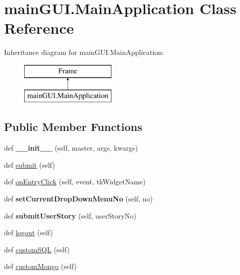 \hypertarget{classmain_g_u_i_1_1_main_application}{}\section{main\+G\+U\+I.\+Main\+Application Class Reference}
\label{classmain_g_u_i_1_1_main_application}
Inheritance diagram for main\+G\+U\+I.\+Main\+Application\+:\begin{figure}[H]
\begin{center}
\leavevmode
\includegraphics[height=2.000000cm]{classmain_g_u_i_1_1_main_application}
\end{center}
\end{figure}
\subsection*{Public Member Functions}
\begin{DoxyCompactItemize}
\item 
\hypertarget{classmain_g_u_i_1_1_main_application_acac3bbf3ac2feae88abdf108ec7d41e0}{}\label{classmain_g_u_i_1_1_main_application_acac3bbf3ac2feae88abdf108ec7d41e0} 
def {\bfseries \+\_\+\+\_\+init\+\_\+\+\_\+} (self, master, args, kwargs)
\item 
def \hyperlink{classmain_g_u_i_1_1_main_application_a828c13a008e6029d6f9aac3d3f6189fd}{submit} (self)
\item 
def \hyperlink{classmain_g_u_i_1_1_main_application_a8389dd29b6914c6e878435ba3176f2af}{on\+Entry\+Click} (self, event, tk\+Widget\+Name)
\item 
\hypertarget{classmain_g_u_i_1_1_main_application_a338c7e4b5eb933d02649355337da1250}{}\label{classmain_g_u_i_1_1_main_application_a338c7e4b5eb933d02649355337da1250} 
def {\bfseries set\+Current\+Drop\+Down\+Menu\+No} (self, no)
\item 
\hypertarget{classmain_g_u_i_1_1_main_application_a32456a8dcc69bf8b72d3c42e8ec9b8f1}{}\label{classmain_g_u_i_1_1_main_application_a32456a8dcc69bf8b72d3c42e8ec9b8f1} 
def {\bfseries submit\+User\+Story} (self, user\+Story\+No)
\item 
def \hyperlink{classmain_g_u_i_1_1_main_application_af3fa9d6210d07607eb8161acd340eed0}{logout} (self)
\item 
def \hyperlink{classmain_g_u_i_1_1_main_application_a47ac9da75d8ab9ecd89b3e7590ccf754}{custom\+S\+QL} (self)
\item 
def \hyperlink{classmain_g_u_i_1_1_main_application_adfb6937d77ab2cde3eb371057482ab6e}{custom\+Mongo} (self)
\end{DoxyCompactItemize}
